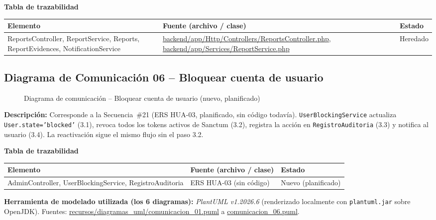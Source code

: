 \bigskip
\noindent\textbf{Tabla de trazabilidad}
\begin{longtable}{|L{5cm}|L{7.5cm}|M{2cm}|}
\hline
{} \textbf{Elemento} & \textbf{Fuente (archivo / clase)} & \textbf{Estado} \\ \hline
\endhead
ReportsController, ReportService, Reports, ReportEvidences, NotificationService & \url{backend/app/Http/Controllers/ReportsController.php}, \url{backend/app/Services/ReportService.php} & Heredado \\ \hline
\end{longtable}
\clearpage

\subsection{Diagrama de Comunicación 06 -- Bloquear cuenta de usuario}
\begin{figure}[H]
    \centering
    \caption{Diagrama de comunicación -- Bloquear cuenta de usuario (nuevo, planificado)}
    \label{fig:com06}
\end{figure}
{\sloppy\noindent\textbf{Descripción:} Corresponde a la Secuencia~\#21 (ERS HUA-03, planificado, sin código todavía). \texttt{UserBlockingService} actualiza \texttt{User.state='blocked'} (3.1), revoca todos los tokens activos de Sanctum (3.2), registra la acción en \texttt{RegistroAuditoria} (3.3) y notifica al usuario (3.4). La reactivación sigue el mismo flujo sin el paso 3.2.\par}

\bigskip
\noindent\textbf{Tabla de trazabilidad}
\begin{longtable}{|L{5cm}|L{7.5cm}|M{2cm}|}
\hline
{} \textbf{Elemento} & \textbf{Fuente (archivo / clase)} & \textbf{Estado} \\ \hline
\endhead
AdminController, UserBlockingService, RegistroAuditoria & ERS HUA-03 (sin código) & Nuevo (planificado) \\ \hline
\end{longtable}

{\sloppy\noindent\textbf{Herramienta de modelado utilizada (los 6 diagramas):} \textit{PlantUML v1.2026.6} (renderizado localmente con \texttt{plantuml.jar} sobre OpenJDK). Fuentes: \url{recursos/diagramas_uml/comunicacion_01.puml} a \url{comunicacion_06.puml}.\par}
\fussy
\clearpage

